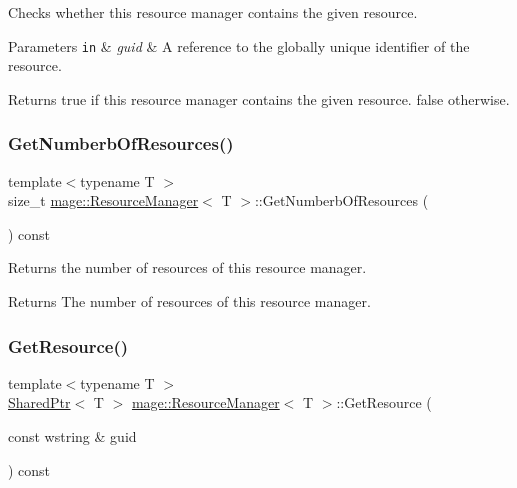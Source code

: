 Checks whether this resource manager contains the given resource.


\begin{DoxyParams}[1]{Parameters}
\mbox{\tt in}  & {\em guid} & A reference to the globally unique identifier of the resource. \\
\hline
\end{DoxyParams}
\begin{DoxyReturn}{Returns}
{\ttfamily true} if this resource manager contains the given resource. {\ttfamily false} otherwise. 
\end{DoxyReturn}
\hypertarget{classmage_1_1_resource_manager_a1872b087dac1794746b320c6ece63fd8}{}\label{classmage_1_1_resource_manager_a1872b087dac1794746b320c6ece63fd8} 
\subsubsection{\texorpdfstring{Get\+Numberb\+Of\+Resources()}{GetNumberbOfResources()}}
{\footnotesize\ttfamily template$<$typename T $>$ \\
size\+\_\+t \hyperlink{classmage_1_1_resource_manager}{mage\+::\+Resource\+Manager}$<$ T $>$\+::Get\+Numberb\+Of\+Resources (\begin{DoxyParamCaption}{ }\end{DoxyParamCaption}) const}

Returns the number of resources of this resource manager.

\begin{DoxyReturn}{Returns}
The number of resources of this resource manager. 
\end{DoxyReturn}
\hypertarget{classmage_1_1_resource_manager_a3da61ed74b8ee7da513039fd8cadeffa}{}\label{classmage_1_1_resource_manager_a3da61ed74b8ee7da513039fd8cadeffa} 
\subsubsection{\texorpdfstring{Get\+Resource()}{GetResource()}}
{\footnotesize\ttfamily template$<$typename T $>$ \\
\hyperlink{namespacemage_a1e01ae66713838a7a67d30e44c67703e}{Shared\+Ptr}$<$ T $>$ \hyperlink{classmage_1_1_resource_manager}{mage\+::\+Resource\+Manager}$<$ T $>$\+::Get\+Resource (\begin{DoxyParamCaption}\item[{const wstring \&}]{guid }\end{DoxyParamCaption}) const}

